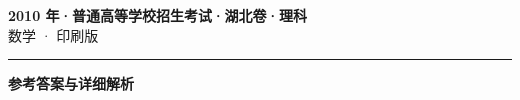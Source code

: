\documentclass[zihao=5, a4paper]{ctexart}
\begin{document}
\begin{center}
  {\Large\bfseries 2010 年·普通高等学校招生考试·湖北卷·理科}\\[4pt]
  {\large 数学 · 印刷版}
\end{center}
\medskip
{}

\par\bigskip\hrule\bigskip
{}
\begin{center}{\large\bfseries 参考答案与详细解析}\end{center}
\smallskip

\end{document}
